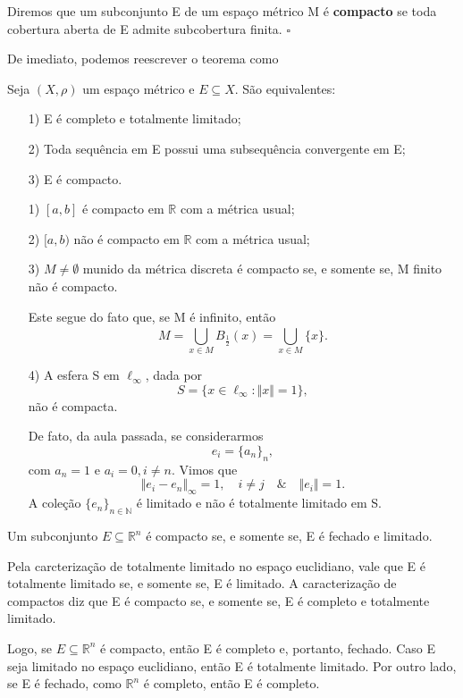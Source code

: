 \documentclass[MetricSpaces/metric_notes.tex]{subfiles}
\begin{document}
\begin{def*}
	Diremos que um subconjunto E de um espaço métrico M é \textbf{compacto} se toda cobertura aberta de E admite subcobertura finita. \(\square\)
\end{def*}
De imediato, podemos reescrever o teorema como
\begin{crl*}
	Seja \((X, \rho )\) um espaço métrico e \(E\subseteq X\). São equivalentes:
	\begin{itemize}
		\item[1)] E é completo e totalmente limitado;
		\item[2)] Toda sequência em E possui uma subsequência convergente em E;
		\item[3)] E é compacto.
	\end{itemize}
\end{crl*}
\begin{example}
	\begin{itemize}
		\item[1)] \([a, b]\) é compacto em \(\mathbb{R}\) com a métrica usual;
		\item[2)] \([a, b)\) não é compacto em \(\mathbb{R}\) com a métrica usual;
		\item[3)] \(M \neq\emptyset\) munido da métrica discreta é compacto se, e somente se,
		      M finito não é compacto.

		      Este segue do fato que, se M é infinito, então
		      \[
			      M = \bigcup_{x\in M}^{}B_{\frac{1}{2}}(x) = \bigcup_{x\in M}^{}\{x\}.
		      \]
		\item[4)] A esfera S em \(\ell_{\infty}\), dada por
		      \[
			      S = \{x\in \ell_{\infty}: \Vert x \Vert = 1\},
		      \]
		      não é compacta.

		      De fato, da aula passada, se considerarmos
		      \[
			      e_{i} = \{a_{n}\}_{n},
		      \]
		      com \(a_{n} = 1\) e \(a_{i} = 0, i\neq n.\) Vimos que
		      \[
			      \Vert e_{i}-e_{n} \Vert_{\infty} = 1,\quad i\neq j\quad\&\quad \Vert e_{i} \Vert = 1.
		      \]
		      A coleção \(\{e_{n}\}_{n\in \mathbb{N}}\) é limitado e não é totalmente limitado em S.
	\end{itemize}
\end{example}
\begin{theorem*}
	Um subconjunto \(E\subseteq \mathbb{R}^{n}\) é compacto se, e somente se, E é fechado e limitado.
\end{theorem*}
\begin{proof*}
	Pela carcterização de totalmente limitado no espaço euclidiano, vale que E é totalmente limitado se, e somente se, E é limitado.
	A caracterização de compactos diz que E é compacto se, e somente se, E é completo e totalmente limitado.

	Logo, se \(E\subseteq \mathbb{R}^{n}\) é compacto, então E é completo e, portanto, fechado. Caso E seja limitado no espaço euclidiano,
	então E é totalmente limitado. Por outro lado, se E é fechado, como \(\mathbb{R}^{n}\) é completo, então E é completo. \qedsymbol
\end{proof*}
\end{document}

